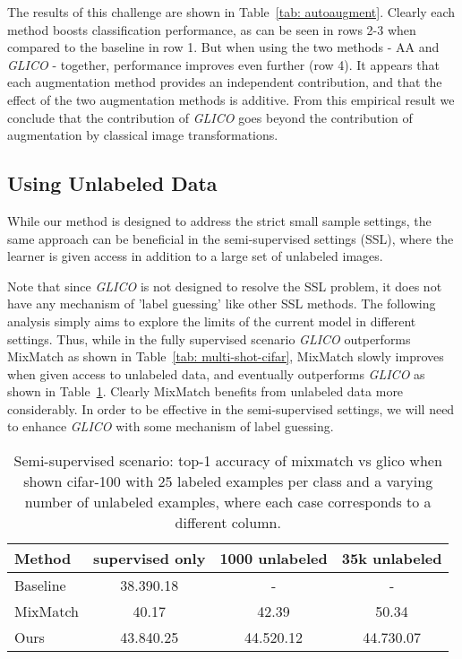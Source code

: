 \documentclass[a4paper,conference]{IEEEtran}
\begin{document}
The results of this challenge are shown in Table~\ref{tab: autoaugment}. Clearly each method boosts classification performance, as can be seen in rows 2-3 when compared to the baseline in row 1. But when using the two methods - AA and \textit{GLICO} - together, performance improves even further (row 4). It appears that each augmentation method provides an independent contribution, and that the effect of the two augmentation methods is additive. From this empirical result we conclude that the contribution of \textit{GLICO} goes beyond the contribution of augmentation by classical image transformations. 

\subsection{Using Unlabeled Data}		
\label{sec:other methods}

While our method is designed to address the strict small sample settings, the same approach can be beneficial in the semi-supervised settings (SSL), where the learner is given access in addition to a large set of unlabeled images.

Note that since \textit{GLICO} is not designed to resolve the SSL problem, it does not have any mechanism of 'label guessing' like other SSL methods. The following analysis simply aims to explore the limits of the current model in different settings. 
Thus, while in the fully supervised scenario \textit{GLICO} outperforms MixMatch as shown in Table~\ref{tab: multi-shot-cifar}, MixMatch slowly improves when given access to unlabeled data, and eventually outperforms \textit{GLICO} as shown in Table~\ref{tab: semisuprvised}. Clearly MixMatch benefits from unlabeled data more considerably. In order to be effective in the semi-supervised settings, we will need to enhance \textit{GLICO} with some mechanism of label guessing. 

\begin{table}[htbp]
	\centering
			
	\caption{Semi-supervised scenario:\MakeLowercase{ Top-1 Accuracy of MixMatch vs GLICO when shown CIFAR-100 with 25 labeled examples per class and a varying number of unlabeled examples, where each case corresponds to a different column.}
	}	
	\label{tab: semisuprvised}
\begin{tabular}{l|ccc}
		\toprule
		Method   & supervised only & 1000 unlabeled & 35k unlabeled  \\
		\midrule
		Baseline & 38.390.18  & -              & -              \\
		MixMatch & 40.17           & 42.39          & 50.34          \\
		Ours     & 43.840.25  & 44.520.12 & 44.730.07 \\
																
		\bottomrule
	\end{tabular}
\end{table}
\end{document}
